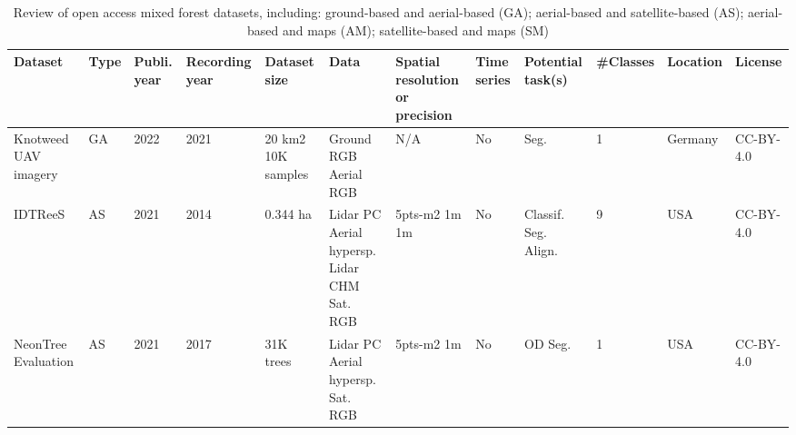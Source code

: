 \documentclass{CUP-JNL-DTM}%
\theoremstyle{definition}
\numberwithin{equation}{section}
\begin{document}
\begin{table*}[ht]
\fontsize{6.5pt}{7.5pt}\selectfont %
\renewcommand{\arraystretch}{1.5} %
\setlength\tabcolsep{5pt} %
\caption{Review of open access mixed forest datasets, including: ground-based and aerial-based (GA); aerial-based and satellite-based (AS); aerial-based and maps (AM); satellite-based and maps (SM)}
{\begin{fntable}
\centering
\begin{adjustwidth}{-0.7cm}{}
\begin{tabular}{p{1.2cm} | p{0.3cm} | p{0.4cm} | p{1cm} | p{1.4cm} | p{1.4cm} : p{1.5cm} | p{0.4cm} | p{0.7cm} | p{1cm} | p{1cm} | p{1.1cm}}
\toprule
Dataset  & Type & Publi. year & Recording year & Dataset size & Data  & Spatial resolution or precision & Time series & Potential task(s) & \#Classes & Location  & License  \\
\midrule

Knotweed UAV imagery \cite{soltani_transfer_2022} & GA & 2022 & 2021 & 20 km2 \newline 10K samples & Ground RGB \newline Aerial RGB  & N/A \newline 0.3cm & No & Seg. & 1 & Germany & CC-BY-4.0 \\

IDTReeS	\cite{marconi_data_2019} & AS & 2021 & 2014  & 0.344 ha & Lidar PC \newline Aerial hypersp. \newline Lidar CHM \newline Sat. RGB & 5pts-m2 \newline 1m \newline 1m \newline 10cm & No & Classif. \newline Seg. \newline Align. & 9 & USA & CC-BY-4.0 \\

NeonTree Evaluation	\cite{weinstein_benchmark_2021} & AS & 2021 & 2017   & 31K trees & Lidar PC \newline Aerial hypersp. \newline Sat. RGB & 5pts-m2 \newline 1m \newline 10cm & No & OD \newline Seg. & 1 & USA & CC-BY-4.0 \\


\end{tabular}
\end{adjustwidth}
\end{fntable}}
\end{table*}
\end{document}
